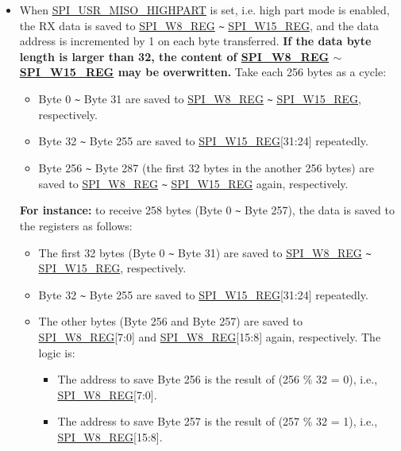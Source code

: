 \documentclass[main\_\_EN.tex]{subfiles}
\begin{document}
\begin{itemize}
\begin{itemize}
        \item When \hyperref[fielddesc:SPIUSRMISOHIGHPART]{SPI\_USR\_MISO\_HIGHPART} is set, i.e. high part mode is enabled, the RX data is saved to \hyperref[regdesc:SPIW8REG]{SPI\_W8\_REG} \verb+~+ \hyperref[regdesc:SPIW15REG]{SPI\_W15\_REG}, and the data address is incremented by 1 on each byte transferred. \textbf{If the data byte length is larger than 32, the content of \hyperref[regdesc:SPIW8REG]{SPI\_W8\_REG} $\sim$ \hyperref[regdesc:SPIW15REG]{SPI\_W15\_REG} may be overwritten.} Take each 256 bytes as a cycle:
        \begin{itemize}
            \item Byte 0 \verb+~+ Byte 31 are saved to \hyperref[regdesc:SPIW8REG]{SPI\_W8\_REG} \verb+~+ \hyperref[regdesc:SPIW15REG]{SPI\_W15\_REG}, respectively.
            \item Byte 32 \verb+~+ Byte 255 are saved to \hyperref[regdesc:SPIW15REG]{SPI\_W15\_REG}[31:24] repeatedly.
            \item Byte 256 \verb+~+ Byte 287 (the first 32 bytes in the another 256 bytes) are saved to \hyperref[regdesc:SPIW8REG]{SPI\_W8\_REG} \verb+~+ \hyperref[regdesc:SPIW15REG]{SPI\_W15\_REG} again, respectively.
        \end{itemize}

        \textbf{For instance:} to receive 258 bytes (Byte 0 \verb+~+ Byte 257), the data is saved to the registers as follows:
        \begin{itemize}
            \item The first 32 bytes (Byte 0 \verb+~+ Byte 31) are saved to \hyperref[regdesc:SPIW8REG]{SPI\_W8\_REG} \verb+~+ \hyperref[regdesc:SPIW15REG]{SPI\_W15\_REG}, respectively.
            \item Byte 32 \verb+~+ Byte 255 are saved to \hyperref[regdesc:SPIW15REG]{SPI\_W15\_REG}[31:24] repeatedly.
            \item The other bytes (Byte 256 and Byte 257) are saved to \hyperref[regdesc:SPIW8REG]{SPI\_W8\_REG}[7:0] and \hyperref[regdesc:SPIW8REG]{SPI\_W8\_REG}[15:8] again, respectively. The logic is:
            \begin{itemize}
                \item The address to save Byte 256 is the result of (256 \% 32 = 0), i.e., \hyperref[regdesc:SPIW8REG]{SPI\_W8\_REG}[7:0].
                \item The address to save Byte 257 is the result of (257 \% 32 = 1), i.e., \hyperref[regdesc:SPIW8REG]{SPI\_W8\_REG}[15:8].
            \end{itemize}
        \end{itemize}
    \end{itemize}
\end{itemize}
\end{document}
